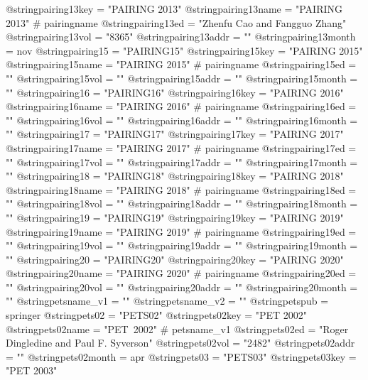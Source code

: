 @string{pairing13key =          "PAIRING 2013"}
@string{pairing13name =         "PAIRING 2013" # pairingname}
@string{pairing13ed =           "Zhenfu Cao and Fangguo Zhang"}
@string{pairing13vol =          "8365"}
@string{pairing13addr =         ""}
@string{pairing13month =        nov}
@string{pairing15 =             "PAIRING15"}
@string{pairing15key =          "PAIRING 2015"}
@string{pairing15name =         "PAIRING 2015" # pairingname}
@string{pairing15ed =           ""}
@string{pairing15vol =          ""}
@string{pairing15addr =         ""}
@string{pairing15month =        ""}
@string{pairing16 =             "PAIRING16"}
@string{pairing16key =          "PAIRING 2016"}
@string{pairing16name =         "PAIRING 2016" # pairingname}
@string{pairing16ed =           ""}
@string{pairing16vol =          ""}
@string{pairing16addr =         ""}
@string{pairing16month =        ""}
@string{pairing17 =             "PAIRING17"}
@string{pairing17key =          "PAIRING 2017"}
@string{pairing17name =         "PAIRING 2017" # pairingname}
@string{pairing17ed =           ""}
@string{pairing17vol =          ""}
@string{pairing17addr =         ""}
@string{pairing17month =        ""}
@string{pairing18 =             "PAIRING18"}
@string{pairing18key =          "PAIRING 2018"}
@string{pairing18name =         "PAIRING 2018" # pairingname}
@string{pairing18ed =           ""}
@string{pairing18vol =          ""}
@string{pairing18addr =         ""}
@string{pairing18month =        ""}
@string{pairing19 =             "PAIRING19"}
@string{pairing19key =          "PAIRING 2019"}
@string{pairing19name =         "PAIRING 2019" # pairingname}
@string{pairing19ed =           ""}
@string{pairing19vol =          ""}
@string{pairing19addr =         ""}
@string{pairing19month =        ""}
@string{pairing20 =             "PAIRING20"}
@string{pairing20key =          "PAIRING 2020"}
@string{pairing20name =         "PAIRING 2020" # pairingname}
@string{pairing20ed =           ""}
@string{pairing20vol =          ""}
@string{pairing20addr =         ""}
@string{pairing20month =        ""}
@string{petsname_v1 =           ""}
@string{petsname_v2 =           ""}
@string{petspub =               springer}
@string{pets02 =                "PETS02"}
@string{pets02key =             "PET 2002"}
@string{pets02name =            "PET~2002" # petsname_v1}
@string{pets02ed =              "Roger Dingledine and Paul F. Syverson"}
@string{pets02vol =             "2482"}
@string{pets02addr =            ""}
@string{pets02month =           apr}
@string{pets03 =                "PETS03"}
@string{pets03key =             "PET 2003"}
